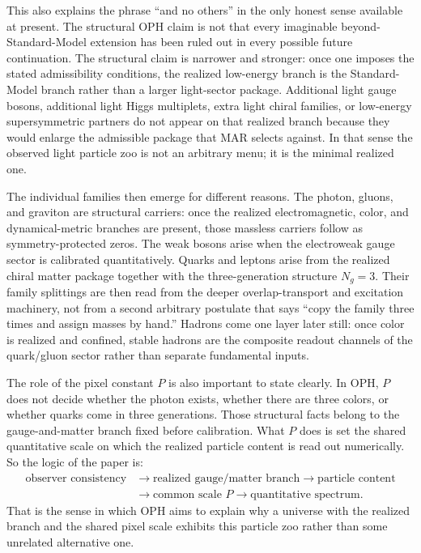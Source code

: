 \documentclass[11pt]{article}
\begin{document}
This also explains the phrase ``and no others'' in the only honest sense available at present.
The structural OPH claim is not that every imaginable beyond-Standard-Model extension has been
ruled out in every possible future continuation. The structural claim is narrower and stronger:
once one imposes the stated admissibility conditions, the realized low-energy branch is the
Standard-Model branch rather than a larger light-sector package. Additional light gauge bosons,
additional light Higgs multiplets, extra light chiral families, or low-energy supersymmetric
partners do not appear on that realized branch because they would enlarge the admissible package
that MAR selects against. In that sense the observed light particle zoo is not an arbitrary menu;
it is the minimal realized one.

The individual families then emerge for different reasons. The photon, gluons, and graviton are
structural carriers: once the realized electromagnetic, color, and dynamical-metric branches are
present, those massless carriers follow as symmetry-protected zeros. The weak bosons arise when
the electroweak gauge sector is calibrated quantitatively. Quarks and leptons arise from the
realized chiral matter package together with the three-generation structure \(N_g=3\). Their
family splittings are then read from the deeper overlap-transport and excitation machinery, not
from a second arbitrary postulate that says ``copy the family three times and assign masses by
hand.'' Hadrons come one layer later still: once color is realized and confined, stable hadrons
are the composite readout channels of the quark/gluon sector rather than separate fundamental
inputs.

The role of the pixel constant \(P\) is also important to state clearly. In OPH, \(P\) does not
decide whether the photon exists, whether there are three colors, or whether quarks come in three
generations. Those structural facts belong to the gauge-and-matter branch fixed before
calibration. What \(P\) does is set the shared quantitative scale on which the realized particle
content is read out numerically. So the logic of the paper is:
\[
\begin{aligned}
\text{observer consistency}
&\to
\text{realized gauge/matter branch}
\to
\text{particle content} \\
&\to
\text{common scale }P
\to
\text{quantitative spectrum}.
\end{aligned}
\]
That is the sense in which OPH aims to explain why a universe with the realized branch and the
shared pixel scale exhibits this particle zoo rather than some unrelated alternative one.
\end{document}
